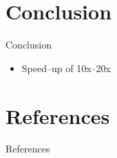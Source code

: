 \documentclass{beamer}
\begin{document}
\section{Conclusion}
\begin{frame}{Conclusion}
	\begin{itemize}
	\item Speed--up of 10x--20x
	\end{itemize}
\end{frame}

\section{References}
\begin{frame}[t,allowframebreaks]{References}
	\nocite{*}
	{\tiny }
\end{frame}
\end{document}
